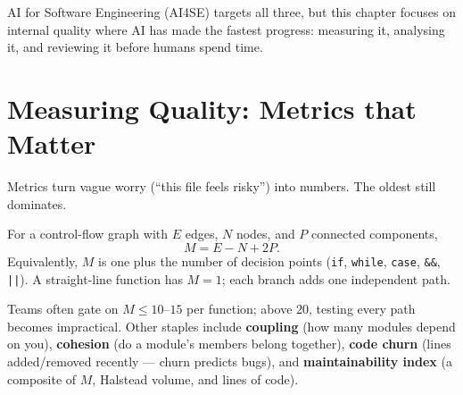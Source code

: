 AI for Software Engineering (AI4SE) targets all three, but this chapter focuses on internal quality where AI has made the fastest progress: measuring it, analysing it, and reviewing it before humans spend time.

\section{Measuring Quality: Metrics that Matter}\label{sec:metrics}
Metrics turn vague worry (``this file feels risky'') into numbers. The oldest still dominates.

\begin{definition}
For a control-flow graph with $E$ edges, $N$ nodes, and $P$ connected components,
\[
  M = E - N + 2P.
\]
Equivalently, $M$ is one plus the number of decision points (\texttt{if}, \texttt{while}, \texttt{case}, \texttt{\&\&}, \texttt{||}). A straight-line function has $M=1$; each branch adds one independent path.
\end{definition}

Teams often gate on $M\le 10$--$15$ per function; above $20$, testing every path becomes impractical. Other staples include \textbf{coupling} (how many modules depend on you), \textbf{cohesion} (do a module's members belong together), \textbf{code churn} (lines added/removed recently --- churn predicts bugs), and \textbf{maintainability index} (a composite of $M$, Halstead volume, and lines of code).

